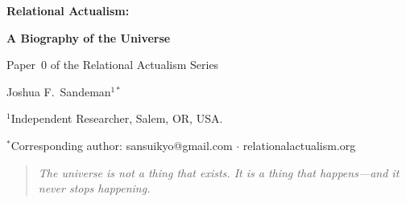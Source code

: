 \documentclass[11pt,a4paper]{article}
\theoremstyle{plain}
\theoremstyle{definition}
\theoremstyle{remark}
\begin{document}
\begin{center}
  {\LARGE\bfseries Relational Actualism:\par}
  \vspace{4pt}
  {\large\bfseries A Biography of the Universe\par}
  \vspace{6pt}
  {\normalsize Paper~0 of the Relational Actualism Series\par}
  \vspace{14pt}
  {\large Joshua F.\ Sandeman$^{1*}$\par}
  \vspace{4pt}
  {\normalsize $^{1}$Independent Researcher, Salem, OR, USA.\par}
  {\normalsize $^{*}$Corresponding author: sansuikyo@gmail.com
   $\cdot$ relationalactualism.org\par}
  \vspace{14pt}
\end{center}

\begin{quote}\itshape
The universe is not a thing that exists.  It is a thing that happens---and
it never stops happening.
\end{quote}

\begin{abstract}
This paper tells a single story: the life of a universe, from the dynamics
of the parent supermassive black hole through the emergence of particles,
spacetime, galaxies, and life, to a future of perpetual branching rather
than heat death.  The story is told in the language of Relational
Actualism~(RA), a framework built on a single ontological commitment: that
irreversible actualization events are the primitive physical reality.
From this commitment, implemented as an irreversibly growing directed
acyclic graph with a unique self-consistent growth rule, the framework
derives the coupling constants, the Standard Model spectrum and gauge
groups, the structural zero cosmological constant, the dark matter
mechanism, the Hubble tension resolution, five CMB anomalies as signatures
of parent SMBH dynamics, the dissolution of the measurement problem, and
substrate-independent conditions for biological complexity---all with no
free parameters.  The theory's logical structure is a constraint web, not
a deduction chain, and its mathematical core has been formally verified
(163~Lean~4 theorems, compiled clean).  This paper maps the complete
framework, catalogues its predictions, and presents the formal
verification record.  The companion papers~(P1--P4) provide the
derivations; this paper provides the meaning.
\end{abstract}
\end{document}
